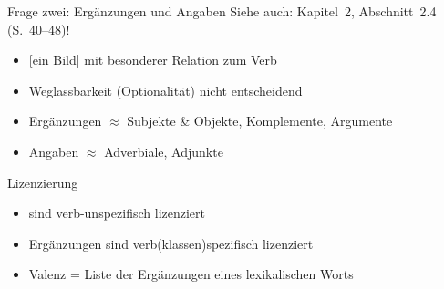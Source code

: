 \begin{frame}
  {Frage zwei: Ergänzungen und Angaben}
  \pause
  Siehe auch: Kapitel~2, Abschnitt~2.4 (S.~40--48)!\\
  \pause\Halbzeile
  \begin{exe}
    \ex\label{ex:valenz034}
    \begin{xlist}
      \pause
      \pause
      \pause
    \end{xlist}
  \end{exe}
  \pause\Halbzeile
  \begin{itemize}[<+->]
    \item \alert{[ein Bild]} mit besonderer Relation zum Verb
    \item \alert{Weglassbarkeit} (Optionalität) nicht entscheidend
      \Halbzeile
    \item Ergänzungen $\approx$ Subjekte \& Objekte, Komplemente, Argumente
    \item Angaben $\approx$ Adverbiale, Adjunkte
  \end{itemize}
\end{frame}

\begin{frame}
  {Lizenzierung}
  \pause
  \begin{exe}
    \ex 
    \begin{xlist}
    \pause
      \pause
      \pause
    \end{xlist}
    \pause\Halbzeile
    \ex 
    \begin{xlist}
      \pause
      \pause
      \pause
      \pause
    \end{xlist}
  \end{exe}
  \pause\Halbzeile
  \begin{itemize}[<+->]
    \item {} sind verb-unspezifisch lizenziert
    \item \alert{Ergänzungen} sind verb(klassen)spezifisch lizenziert
    \item Valenz = Liste der Ergänzungen eines lexikalischen Worts
  \end{itemize}
\end{frame}



